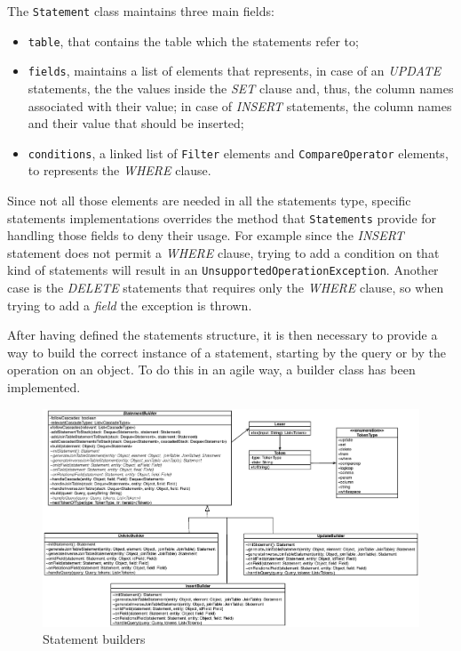 \noindent The \texttt{Statement} class maintains three main fields:
\begin{itemize}
\item \texttt{table}, that contains the table which the statements refer to;
\item \texttt{fields}, maintains a list of elements that represents, in case of an \textit{UPDATE} statements, the the values inside the \textit{SET} clause and, thus, the column names associated with their value; in case of \textit{INSERT} statements, the column names and their value that should be inserted;
\item \texttt{conditions}, a linked list of \texttt{Filter} elements and \texttt{CompareOperator} elements, to represents the \textit{WHERE} clause.
\end{itemize} 

\noindent Since not all those elements are needed in all the statements type, specific statements implementations overrides the method that \texttt{Statements} provide for handling those fields to deny their usage. For example since the \textit{INSERT} statement does not permit a \textit{WHERE} clause, trying to add a condition on that kind of statements will result in an \texttt{UnsupportedOperationException}. Another case is the \textit{DELETE} statements that requires only the \textit{WHERE} clause, so when trying to add a \textit{field} the exception is thrown.

\newparagraph After having defined the statements structure, it is then necessary to provide a way to build the correct instance of a statement, starting by the query or by the operation on an object.
To do this in an agile way, a builder class has been implemented.

\begin{figure}[tbh]
  \includegraphics[width=16cm]{images/builders}
  \caption{Statement builders}
  \label{fig:builders}
\end{figure} 

